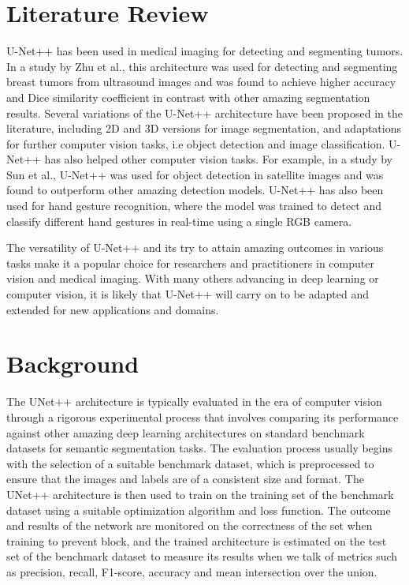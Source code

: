 \documentclass[conference]{IEEEtran}
\begin{document}
\section{Literature Review}

U-Net++ has been used in medical imaging for detecting and segmenting tumors. In a study by Zhu et al., this architecture was used for detecting and segmenting breast tumors from ultrasound images and was found to achieve higher accuracy and Dice similarity coefficient in contrast with other amazing segmentation results. Several variations of the U-Net++ architecture have been proposed in the literature, including 2D and 3D versions for image segmentation, and adaptations for further computer vision tasks, i.e object detection and image classification.
U-Net++ has also helped other computer vision tasks. For example, in a study by Sun et al., U-Net++ was used for object detection in satellite images and was found to outperform other amazing detection models. U-Net++ has also been used for hand gesture recognition, where the model was trained to detect and classify different hand gestures in real-time using a single RGB camera.

The versatility of U-Net++ and its try to attain amazing outcomes in various tasks make it a popular choice for researchers and practitioners in computer vision and medical imaging. With many others advancing in deep learning or computer vision, it is likely that U-Net++ will carry on  to be adapted and extended for new applications and domains.



\section{Background}
The UNet++ architecture is typically evaluated in the era of computer vision through a rigorous experimental process that involves comparing its performance against other amazing deep learning architectures on standard benchmark datasets for semantic segmentation tasks. The evaluation process usually begins with the selection of a suitable benchmark dataset, which is preprocessed to ensure that the images and labels are of a consistent size and format. The UNet++ architecture is then used to train on the training set of the benchmark dataset using a suitable optimization algorithm and loss function. The outcome and results of the network are monitored on the correctness of the set when training to prevent block, and the trained architecture is estimated on the test set of the benchmark dataset to measure its results when we talk of metrics such as precision, recall, F1-score, accuracy and mean intersection over the union. 
\end{document}
